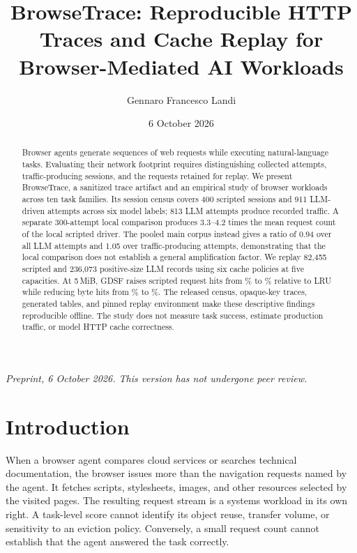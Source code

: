 \documentclass[10pt,sigconf,nonacm]{acmart}
\newcommand{\sysname}{BrowseTrace\xspace}
\newcommand{\mib}{\,MiB\xspace}
\begin{document}
\title{BrowseTrace: Reproducible HTTP Traces and Cache Replay for Browser-Mediated AI Workloads}
\author{Gennaro Francesco Landi}
\date{6 October 2026}
\renewcommand{\shortauthors}{G. F. Landi}

\begin{abstract}
Browser agents generate sequences of web requests while executing natural-language tasks. Evaluating their network footprint requires distinguishing collected attempts, traffic-producing sessions, and the requests retained for replay. We present \sysname, a sanitized trace artifact and an empirical study of browser workloads across ten task families. Its session census covers 400 scripted sessions and 911 LLM-driven attempts across six model labels; 813 LLM attempts produce recorded traffic. A separate 300-attempt local comparison produces 3.3--4.2 times the mean request count of the local scripted driver. The pooled main corpus instead gives a ratio of 0.94 over all LLM attempts and 1.05 over traffic-producing attempts, demonstrating that the local comparison does not establish a general amplification factor. We replay 82{,}455 scripted and 236{,}073 positive-size LLM records using six cache policies at five capacities. At 5\mib, GDSF raises scripted request hits from \BTScriptedLRURequestPct\% to \BTScriptedGDSFRequestPct\% relative to LRU while reducing byte hits from \BTScriptedLRUBytePct\% to \BTScriptedGDSFBytePct\%. The released census, opaque-key traces, generated tables, and pinned replay environment make these descriptive findings reproducible offline. The study does not measure task success, estimate production traffic, or model HTTP cache correctness.
\end{abstract}
\maketitle
{}
\pagestyle{plain}
\raggedbottom
\noindent\textit{Preprint, 6 October 2026. This version has not undergone peer review.}

\section{Introduction}
\label{sec:intro}
When a browser agent compares cloud services or searches technical documentation, the browser issues more than the navigation requests named by the agent. It fetches scripts, stylesheets, images, and other resources selected by the visited pages. The resulting request stream is a systems workload in its own right. A task-level score cannot identify its object reuse, transfer volume, or sensitivity to an eviction policy. Conversely, a small request count cannot establish that the agent answered the task correctly.
\end{document}
